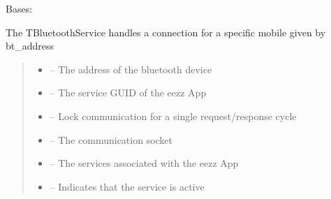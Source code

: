 \documentclass[letterpaper,10pt,english]{sphinxmanual}
\begin{document}

\begin{savenotes}\begin{fulllineitems}
\label{\detokenize{eezz:eezz.blueserv.TBluetoothService}}
\pysigstartsignatures
{}
\pysigstopsignatures
\sphinxAtStartPar
Bases: 

\sphinxAtStartPar
The TBluetoothService handles a connection for a specific mobile given by bt\_address
\begin{quote}\begin{description}
\begin{itemize}
\item {} 
\sphinxAtStartPar
{} – The address of the bluetooth device

\item {} 
\sphinxAtStartPar
{} – The service GUID of the eezz App

\item {} 
\sphinxAtStartPar
{} – Lock communication for a single request/response cycle

\item {} 
\sphinxAtStartPar
{} – The communication socket

\item {} 
\sphinxAtStartPar
{} – The services associated with the eezz App

\item {} 
\sphinxAtStartPar
{} – Indicates that the service is active


\end{itemize}
\end{description}
\end{quote}
\end{fulllineitems}
\end{savenotes}
\end{document}
